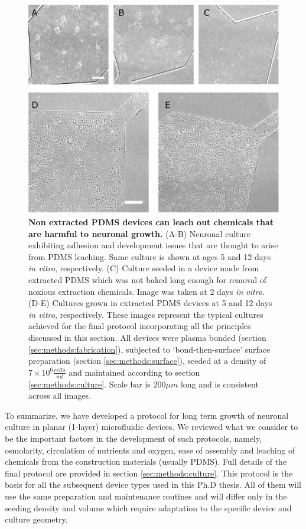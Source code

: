         \begin{figure}[!htb]
            \centering
            \includegraphics[width=15cm]{chapter4/figures/extraction/extractionIssue.jpg}
            \caption[Demonstration of PDMS related contaminations and the extraction procedure]{\textbf{Non extracted PDMS devices can leach out chemicals that are harmful to neuronal growth.} (A-B) Neuronal culture exhibiting adhesion and development issues that are thought to arise from PDMS leaching. Same culture is shown at ages 5 and 12 days \textit{in vitro}, respectively. (C) Culture seeded in a device made from extracted PDMS which was not baked long enough for removal of noxious extraction chemicals. Image was taken at 2 days \textit{in vitro}. (D-E) Cultures grown in extracted PDMS devices at 5 and 12 days \textit{in vitro}, respectively. These images represent the typical cultures achieved for the final protocol incorporating all the principles discussed in this section. All devices were plasma bonded (section \ref{sec:methods:fabrication}), subjected to `bond-then-surface' surface preparation (section \ref{sec:methods:surface}), seeded at a density of \(7\times10^6 \frac{cells}{ml}\) and maintained according to section \ref{sec:methods:culture}. Scale bar is \(200 \mu m\) long and is consistent across all images.}
            \label{fig:devices:extraction}
        \end{figure}

        To summarize, we have developed a protocol for long term growth of neuronal culture in planar (1-layer) microfluidic devices. We reviewed what we consider to be the important factors in the development of such protocols, namely, osmolarity, circulation of nutrients and oxygen, ease of assembly and leaching of chemicals from the construction materials (usually PDMS). Full details of the final protocol are provided in section \ref{sec:methods:culture}. This protocol is the basis for all the subsequent device types used in this Ph.D thesis. All of them will use the same preparation and maintenance routines and will differ only in the seeding density and volume which require adaptation to the specific device and culture geometry.

